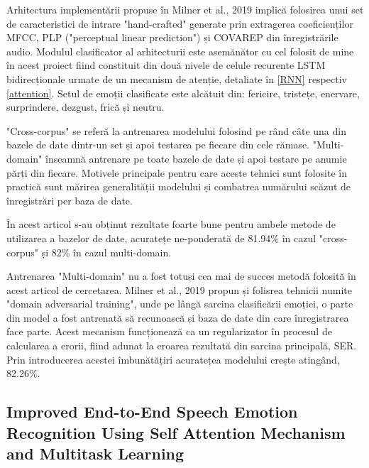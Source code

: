 \documentclass[a4paper,12pt]{book}
\begin{document}
					Arhitectura implementării propuse în Milner et al., 2019 \cite{multi-domain} implică folosirea unui set de caracteristici de intrare "hand-crafted" generate prin extragerea coeficienților MFCC, PLP ("perceptual linear prediction") și COVAREP \cite{covarep} din înregistrările audio. Modulul clasificator al arhitecturii este asemănător cu cel folosit de mine în acest proiect fiind constituit din două nivele de celule recurente LSTM bidirecționale  urmate de un mecanism de atenție, detaliate în \ref{RNN} respectiv \ref{attention}. Setul de emoții clasificate este alcătuit din: fericire, tristețe, enervare, surprindere, dezgust, frică și neutru. \par
					
					"Cross-corpus" se referă la antrenarea modelului folosind pe rând câte una din bazele de date dintr-un set și apoi testarea pe fiecare din cele rămase. "Multi-domain" înseamnă antrenare pe toate bazele de date și apoi testare pe anumie părți din fiecare. Motivele principale pentru care aceste tehnici sunt folosite în practică sunt mărirea generalității modelului și combatrea numărului scăzut de înregistrări per baza de date. \par
					
					În acest articol s-au obținut rezultate foarte bune pentru ambele metode de utilizarea a bazelor de date, acuratețe ne-ponderată de  81.94\% în cazul "cross-corpus" și 82\% în cazul multi-domain. \par					
					
					Antrenarea "Multi-domain" nu a fost totuși cea mai de succes metodă folosită în acest articol de cercetarea. Milner et al., 2019 \cite{multi-domain} propun și folisrea tehnicii numite "domain adversarial training", unde pe lângă sarcina clasificării emoției, o parte din model a fost antrenată să recunoască și baza de date din care înregistrarea face parte. Acest mecanism funcționează ca un regularizator în procesul de calcularea a erorii, fiind adunat la eroarea rezultată din sarcina principală, SER. Prin introducerea acestei îmbunătățiri acuratețea modelului crește atingând, 82.26\%. \par
						
					\subsection{Improved End-to-End Speech Emotion Recognition Using Self Attention	Mechanism and Multitask Learning} \label{end-to-end2}
					
\end{document}
